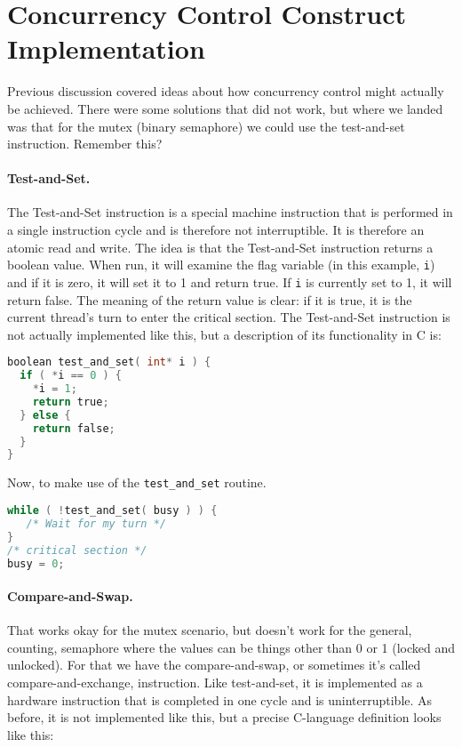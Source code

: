 





\section*{Concurrency Control Construct Implementation}
Previous discussion covered ideas about how concurrency control might actually be achieved. There were some solutions that did not work, but where we landed was that for the mutex (binary semaphore) we could use the test-and-set instruction. Remember this?

\paragraph{Test-and-Set.}
The Test-and-Set instruction is a special machine instruction that is performed in a single instruction cycle and is therefore not interruptible. It is therefore an atomic read and write. The idea is that the Test-and-Set instruction returns a boolean value. When run, it will examine the flag variable (in this example, \texttt{i}) and if it is zero, it will set it to 1 and return true. If \texttt{i} is currently set to 1, it will return false. The meaning of the return value is clear: if it is true, it is the current thread's turn to enter the critical section. The Test-and-Set instruction is not actually implemented like this, but a description of its functionality in C is:

\begin{lstlisting}[language=C]
boolean test_and_set( int* i ) {
  if ( *i == 0 ) {
    *i = 1;
    return true;
  } else {
    return false;
  }
}
\end{lstlisting}


Now, to make use of the \texttt{test\_and\_set} routine.

\begin{lstlisting}[language=C]
while ( !test_and_set( busy ) ) {
   /* Wait for my turn */
}
/* critical section */
busy = 0;
\end{lstlisting}

\paragraph{Compare-and-Swap.} That works okay for the mutex scenario, but doesn't work for the general, counting, semaphore where the values can be things other than 0 or 1 (locked and unlocked). For that we have the compare-and-swap, or sometimes it's called compare-and-exchange, instruction. Like test-and-set, it is implemented as a hardware instruction that is completed in one cycle and is uninterruptible. As before, it is not implemented like this, but a precise C-language definition looks like this:

